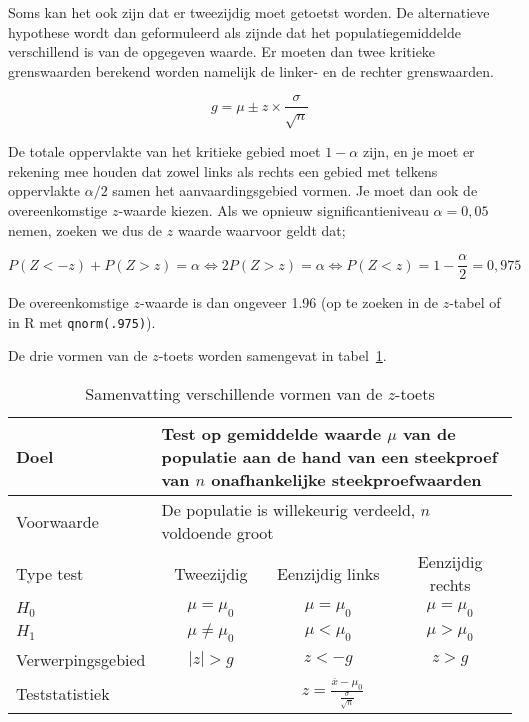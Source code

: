 Soms kan het ook zijn dat er tweezijdig moet getoetst worden. De alternatieve hypothese wordt dan geformuleerd als zijnde dat het populatiegemiddelde verschillend is van de opgegeven waarde. Er moeten dan twee kritieke grenswaarden berekend worden namelijk de linker- en de rechter grenswaarden.

\begin{equation}
  g = \mu \pm z \times \frac{\sigma}{\sqrt{n}}
  \label{eq:kritieke-waarde-tweezijdig}
\end{equation}

De totale oppervlakte van het kritieke gebied moet $1 - \alpha$ zijn, en je moet er rekening mee houden dat zowel links als rechts een gebied met telkens oppervlakte $\alpha / 2$ samen het aanvaardingsgebied vormen. Je moet dan ook de overeenkomstige $z$-waarde kiezen. Als we opnieuw significantieniveau $\alpha = 0,05$ nemen, zoeken we dus de $z$ waarde waarvoor geldt dat;

\[P(Z < -z) + P(Z > z) = \alpha \Leftrightarrow 2 P(Z>z) = \alpha \Leftrightarrow P(Z < z) = 1-\frac{\alpha}{2} = 0,975\]

De overeenkomstige $z$-waarde is dan ongeveer 1.96 (op te zoeken in de $z$-tabel of in R met \texttt{qnorm(.975)}).

De drie vormen van de $z$-toets worden samengevat in tabel~\ref{tab:toetsingsprocedures}.

\begin{table}
  \centering
  \begin{tabular}{l|ccc}
    \toprule
    Doel              & \multicolumn{3}{l}{\parbox{.5\textwidth}{Test op gemiddelde waarde $\mu$ van de populatie aan de hand van een steekproef van $n$ onafhankelijke steekproefwaarden}} \\
    \midrule
    Voorwaarde        & \multicolumn{3}{l}{\parbox{.5\textwidth}{De populatie is willekeurig verdeeld, $n$ voldoende groot}} \\
    \midrule
    Type test         & Tweezijdig           & Eenzijdig links & Eenzijdig rechts \\
    \midrule
    $H_{0}$           & $\mu = \mu_{0}$      & $\mu = \mu_{0}$ & $\mu = \mu_{0}$  \\
    $H_{1}$           & $\mu \neq \mu_{0}$   & $\mu < \mu_{0}$ & $\mu > \mu_{0}$  \\
    Verwerpingsgebied & $\left|z\right| > g$ & $z< -g $        & $z>g$            \\
    Teststatistiek    & \multicolumn{3}{c}{$z = \frac{\overline{x} - \mu_{0}}{\frac{\sigma}{\sqrt{n}}}$} \\
    \bottomrule
  \end{tabular}
  \caption{Samenvatting verschillende vormen van de $z$-toets}
  \label{tab:toetsingsprocedures}
\end{table}

